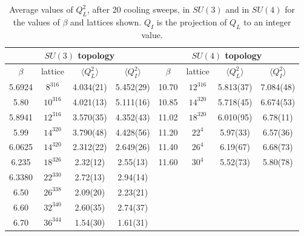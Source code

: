\documentclass[12pt]{article}
\begin{document}
\begin{table}[htb]
\centering
\begin{tabular}{|c|c|c|c||c|c|c|c|} \hline
\multicolumn{4}{|c|}{$SU(3)$ topology} & \multicolumn{4}{|c|}{$SU(4)$ topology} \\ \hline
$\beta$  &  lattice  & $\langle Q^2_L \rangle$ & $\langle Q_I^2 \rangle$
& $\beta$  &  lattice  & $\langle Q^2_L \rangle$ & $\langle Q_I^2 \rangle$ \\ \hline
5.6924 & $8^316$  & 4.034(21) &  5.452(29)  & 10.70 & $12^316$  & 5.813(37) & 7.084(48) \\
5.80   & $10^316$ & 4.021(13) &  5.111(16)  & 10.85 & $14^320$  & 5.718(45) & 6.674(53) \\
5.8941 & $12^316$ & 3.570(35) &  4.352(43)  & 11.02 & $18^320$  & 6.010(95) & 6.78(11) \\
5.99   & $14^320$ & 3.790(48) &  4.428(56)  & 11.20 & $22^4$    & 5.97(33)  & 6.57(36) \\
6.0625 & $14^320$ & 2.312(22) &  2.649(26)  & 11.40 & $26^4$    & 6.19(67)  & 6.68(73) \\
6.235  & $18^326$ & 2.32(12)  &  2.55(13)   & 11.60 & $30^4$    & 5.52(73)  & 5.80(78) \\
6.3380 & $22^330$ & 2.72(13)  &  2.94(14)   &  &  &  &  \\
6.50   & $26^338$ & 2.09(20)  &  2.23(21)   &  &  &  &  \\
6.60   & $32^340$ & 2.60(35)  &  2.74(37)   &  &  &  &  \\
6.70   & $36^344$ & 1.54(30)  &  1.61(31)   &  &  &  &  \\ \hline
\end{tabular}
\caption{Average values of $Q_L^2$, after 20 cooling sweeps, in $SU(3)$ and in  $SU(4)$
  for the values of $\beta$ and lattices shown.
  $Q_I$ is the projection of $Q_L$ to an integer value.}
\label{table_QQ_SU3_SU4}
\end{table}
\end{document}

